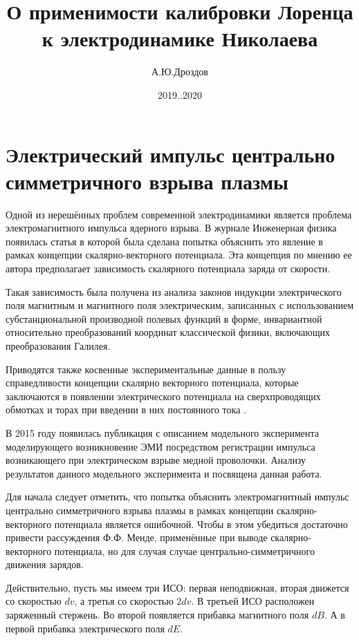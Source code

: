 \documentclass[11pt]{article}
\author{А.Ю.Дроздов}
\title{О применимости калибровки Лоренца к электродинамике Николаева}
\date{2019..2020}
\begin{document}
    
    \maketitle
    

\section*{Электрический импульс центрально симметричного взрыва плазмы}
    

    
    Одной из нерешённых проблем современной электродинамики является
проблема электромагнитного импульса ядерного взрыва. В журнале
Инженерная физика появилась статья \cite{Mende2013} в
которой была сделана попытка объяснить это явление в рамках концепции
скалярно-векторного потенциала. Эта концепция по мнению ее автора
предполагает зависимость скалярного потенциала заряда от скорости.

Такая зависимость была получена из анализа законов индукции электрического
поля магнитным и магнитного поля электрическим, записанных с
использованием субстанциональной производной полевых функций в форме,
инвариантной относительно преобразований координат классической физики,
включающих преобразования Галилея.

Приводятся также косвенные
экспериментальные данные в пользу справедливости концепции скалярно
векторного потенциала, которые заключаются в появлении электрического
потенциала на сверхпроводящих обмотках и торах при введении в них
постоянного тока \cite{Edwards1976} \cite{Roser1962} \cite{Baker1964} \cite{Mende1993}.

В 2015 году появилась публикация \cite{Mende2015} с описанием
модельного эксперимента моделирующего возникновение ЭМИ посредством
регистрации импульса возникающего при электрическом взрыве медной
проволочки. Анализу результатов данного модельного эксперимента и
посвящена данная работа.

Для начала следует отметить, что попытка
объяснить электромагнитный импульс центрально симметричного взрыва
плазмы в рамках концепции скалярно-векторного потенциала является
ошибочной. Чтобы в этом убедиться достаточно привести рассуждения Ф.Ф.
Менде, применённые при выводе скалярно-векторного потенциала, но для
случая случае центрально-симметричного движения зарядов.

Действительно, пусть мы имеем три ИСО: первая неподвижная, вторая движется со скоростью
\(dv\), а третья со скоростью \(2dv\). В третьей ИСО расположен
заряженный стержень. Во второй появляется прибавка магнитного поля
\(dB\). А в первой прибавка электрического поля \(dE\).
\end{document}
